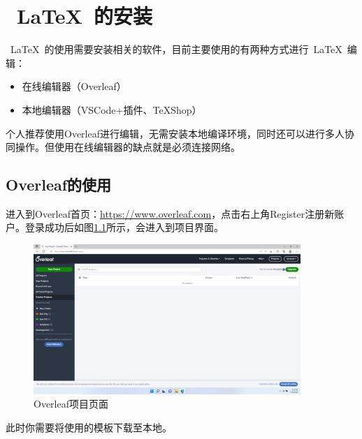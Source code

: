 \chapter{~\LaTeX~的安装}

~\LaTeX~的使用需要安装相关的软件，目前主要使用的有两种方式进行~\LaTeX~编辑：
\begin{itemize}
    \item 在线编辑器（Overleaf）
    \item 本地编辑器（VSCode+插件、TeXShop）
\end{itemize}

个人推荐使用Overleaf进行编辑，无需安装本地编译环境，同时还可以进行多人协同操作。但使用在线编辑器的缺点就是必须连接网络。

\section{Overleaf的使用}

进入到Overleaf首页：\url{https://www.overleaf.com}，点击右上角Register注册新账户。登录成功后如图\ref{fig:1-overlead-home}所示，会进入到项目界面。

\begin{figure}[htb]
    \centering
    \includegraphics[width=0.9\textwidth]{figures/chapter2/overleaf-home.png}
    \caption{Overleaf项目页面}
    \label{fig:1-overlead-home}
\end{figure}

此时你需要将使用的模板下载至本地。